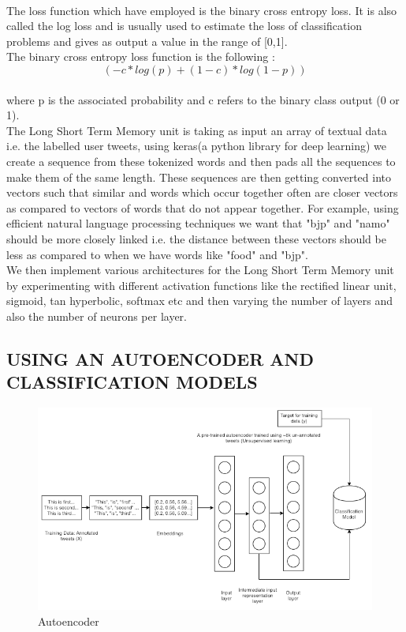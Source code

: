 \documentclass[a4paper,11pt]{article}
\begin{document}
\medskip\\
The loss function which have employed is the binary cross entropy loss. It is also called the log loss and is usually used to estimate the loss of classification problems and gives as output a value in the range of [0,1].
\medskip\\
The binary cross entropy loss function is the following :
\begin{equation}
    (-c * log(p) + (1 - c) * log(1 - p))
 \end{equation}
\\
where p is the associated probability and c refers to the binary class output (0 or 1).
\medskip\\
The Long Short Term Memory unit is taking as input an array of textual data i.e. the labelled user tweets, using keras(a python library for deep learning) we create a sequence from these tokenized words and then pads all the sequences to make them of the same length. These sequences are then getting converted into vectors such that similar and words which occur together often are closer vectors as compared to vectors of words that do not appear together.
For example, using efficient natural language processing techniques we want that "bjp" and "namo" should be more closely linked i.e. the distance between these vectors should be less as compared to when we have words like "food" and "bjp".
\medskip\\
We then implement various architectures for the Long Short Term Memory unit by experimenting with different activation functions like the rectified linear unit, sigmoid, tan hyperbolic, softmax etc and then varying the number of layers and also the number of neurons per layer.
\newpage
\subsection{USING AN AUTOENCODER AND CLASSIFICATION MODELS}
\begin{figure}[ht]
    \centering
    \includegraphics[width=\linewidth]{ae2.png}
    \caption{Autoencoder}
    \label{fig:my_label}
\end{figure}
\end{document}
